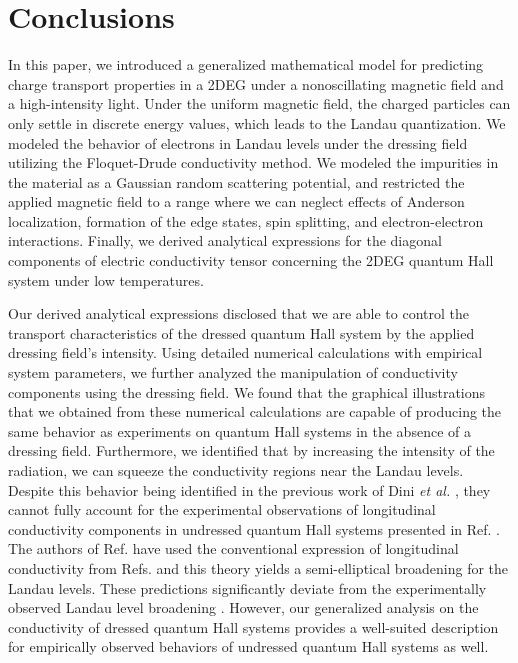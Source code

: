 \documentclass[
 reprint,
 amsmath,amssymb,
 aps,
 prb,
]{revtex4-2}
\begin{document}
\section{\label{sec:conclusions} Conclusions}

In this paper, we introduced a generalized mathematical model for predicting  charge transport properties in a 2DEG under a nonoscillating magnetic field and a high-intensity light. Under the uniform magnetic field, the charged particles can only settle in discrete energy values, which leads to the Landau quantization. We modeled the behavior of electrons in Landau levels under the dressing field utilizing the Floquet-Drude conductivity method. {\color{Red}
We modeled the impurities in the material as a Gaussian random scattering potential, and restricted the applied magnetic field to a range where we can neglect effects of Anderson localization, formation of the edge states, spin splitting, and electron-electron interactions.} Finally, we derived analytical expressions for the diagonal components of electric conductivity tensor concerning the 2DEG quantum Hall system under low temperatures.

Our derived analytical expressions disclosed that we are able to control the transport characteristics of the dressed quantum Hall system by the applied dressing field’s intensity. Using detailed numerical calculations with empirical system parameters, we further analyzed the manipulation of conductivity components using the dressing field.
We found that the graphical illustrations that we obtained from these numerical calculations are capable of producing the same behavior as experiments on quantum Hall systems in the absence of a dressing field.
Furthermore, we identified that by increasing the intensity of the radiation, we can squeeze the conductivity regions near the Landau levels. {\color{Red}Despite this behavior being identified in the previous work of Dini \textit{et al.}  \cite{dini16}, they cannot fully account for the experimental observations of longitudinal conductivity components in undressed quantum Hall systems presented in Ref. \cite{endo09}. The authors of Ref. \cite{dini16} have used the conventional expression of longitudinal conductivity from Refs. \cite{ando74_1,ando82} and this theory yields a semi-elliptical broadening for the Landau levels. These predictions significantly deviate from the experimentally observed Landau level broadening \cite{endo09}.
However, our generalized analysis on the conductivity of dressed quantum Hall systems provides a well-suited description for empirically observed behaviors of undressed quantum Hall systems as well.}
\end{document}
